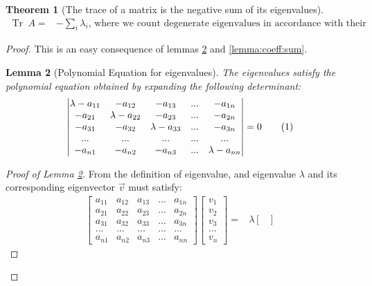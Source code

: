 \documentclass[]{article}
\newcommand\numberthis{\addtocounter{equation}{1}\tag{\theequation}}
\newtheorem{thm}{Theorem}
\newtheorem{lemma}[thm]{Lemma}
\DeclareMathOperator{\Tr}{Tr \;}
\begin{document}
\begin{thm}[The trace of a matrix is the negative sum of its eigenvalues]\label{thm:sum:ev}
	\begin{align*}
		\Tr A =& - \sum_i \lambda_i \text{, where we count degenerate eigenvalues in accordance with their multiplicity.}
	\end{align*}
\end{thm}

\begin{proof}
	This is an easy consequence of lemmas \ref{lemma:ev:determinant} and \ref{lemma:coeff:sum}. 
		\begin{lemma}[Polynomial Equation for eigenvalues]\label{lemma:ev:determinant}
			The eigenvalues satisfy the polynomial equation obtained by expanding the following determinant:
			\begin{align*}
				\begin{vmatrix}
					\lambda-a_{11}&-a_{12}&-a_{13}&...&-a_{1n}\\
					-a_{21}&\lambda-a_{22}&-a_{23}&...&-a_{2n}\\
					-a_{31}&-a_{32}&\lambda-a_{33}&...&-a_{3n}\\
					...&...&...&...&...\\
					-a_{n1}&-a_{n2}&-a_{n3}&...&\lambda-a_{nn}
				\end{vmatrix}=0\numberthis\label{eq:eigen:determinant}
			\end{align*}
		\end{lemma}
		\begin{proof}[Proof of Lemma \ref{lemma:ev:determinant}]
		From the definition of eigenvalue, and eigenvalue $\lambda$ and its corresponding eigenvector $\vec{v}$ must satisfy:
		\begin{align*}
			\begin{bmatrix}
				a_{11}&a_{12}&a_{13}&...&a_{1n}\\
				a_{21}&a_{22}&a_{23}&...&a_{2n}\\
				a_{31}&a_{32}&a_{33}&...&a_{3n}\\
				...&...&...&...&...\\
				a_{n1}&a_{n2}&a_{n3}&...&a_{nn}
			\end{bmatrix}\begin{bmatrix}
				v_1\\
				v_2\\
				v_3\\
				...\\
				v_n
			\end{bmatrix}=&\lambda \begin{bmatrix}

\end{bmatrix}
\end{align*}
\end{proof}
\end{proof}
\end{document}

